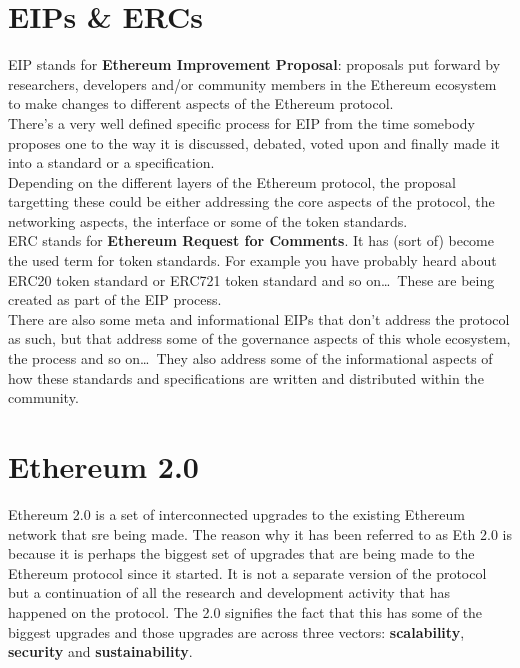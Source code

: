\section{EIPs \& ERCs}

EIP stands for \textbf{Ethereum Improvement Proposal}: proposals put forward by researchers, developers and/or community members in the Ethereum ecosystem to make changes to different aspects of the Ethereum protocol.\\

There's a very well defined specific process for EIP from the time somebody proposes one to the way it is discussed, debated, voted upon and finally made it into a standard or a specification.\\

Depending on the different layers of the Ethereum protocol, the proposal targetting these could be either addressing the core aspects of the protocol, the networking aspects, the interface or some of the token standards.\\

ERC stands for \textbf{Ethereum Request for Comments}.
It has (sort of) become the used term for token standards. 
For example you have probably heard about ERC20 token standard or ERC721 token standard and so on\dots\,
These are being created as part of the EIP process.\\

There are also some meta and informational EIPs that don't address the protocol as such, but that address some of the governance aspects of this whole ecosystem, the process and so on\dots\,
They also address some of the informational aspects of how these standards and specifications are written and distributed within the community.

\section{Ethereum 2.0}
Ethereum 2.0 is a set of interconnected upgrades to the existing Ethereum network that sre being made.
The reason why it has been referred to as Eth 2.0 is because it is perhaps the biggest set of upgrades that are being made to the Ethereum protocol since it started.
It is not a separate version of the protocol but a continuation of all the research and development activity that has happened on the protocol.
The 2.0 signifies the fact that this has some of the biggest upgrades and those upgrades are across three vectors: \textbf{scalability}, \textbf{security} and \textbf{sustainability}.


